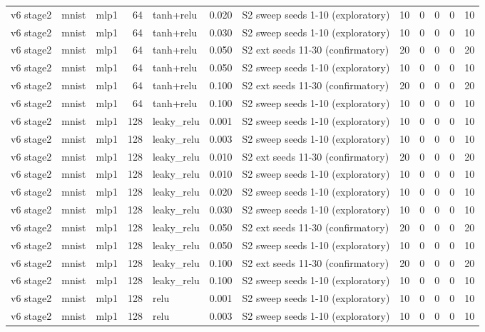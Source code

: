 \begin{table}[htbp]
{\begin{tabular}{@{}lllrlrlrrrrr@{}}
v6 stage2 & mnist & mlp1 & 64 & tanh+relu & 0.020 & S2 sweep seeds 1-10 (exploratory) & 10 & 0 & 0 & 0 & 10 \\
v6 stage2 & mnist & mlp1 & 64 & tanh+relu & 0.030 & S2 sweep seeds 1-10 (exploratory) & 10 & 0 & 0 & 0 & 10 \\
v6 stage2 & mnist & mlp1 & 64 & tanh+relu & 0.050 & S2 ext seeds 11-30 (confirmatory) & 20 & 0 & 0 & 0 & 20 \\
v6 stage2 & mnist & mlp1 & 64 & tanh+relu & 0.050 & S2 sweep seeds 1-10 (exploratory) & 10 & 0 & 0 & 0 & 10 \\
v6 stage2 & mnist & mlp1 & 64 & tanh+relu & 0.100 & S2 ext seeds 11-30 (confirmatory) & 20 & 0 & 0 & 0 & 20 \\
v6 stage2 & mnist & mlp1 & 64 & tanh+relu & 0.100 & S2 sweep seeds 1-10 (exploratory) & 10 & 0 & 0 & 0 & 10 \\
v6 stage2 & mnist & mlp1 & 128 & leaky\_relu & 0.001 & S2 sweep seeds 1-10 (exploratory) & 10 & 0 & 0 & 0 & 10 \\
v6 stage2 & mnist & mlp1 & 128 & leaky\_relu & 0.003 & S2 sweep seeds 1-10 (exploratory) & 10 & 0 & 0 & 0 & 10 \\
v6 stage2 & mnist & mlp1 & 128 & leaky\_relu & 0.010 & S2 ext seeds 11-30 (confirmatory) & 20 & 0 & 0 & 0 & 20 \\
v6 stage2 & mnist & mlp1 & 128 & leaky\_relu & 0.010 & S2 sweep seeds 1-10 (exploratory) & 10 & 0 & 0 & 0 & 10 \\
v6 stage2 & mnist & mlp1 & 128 & leaky\_relu & 0.020 & S2 sweep seeds 1-10 (exploratory) & 10 & 0 & 0 & 0 & 10 \\
v6 stage2 & mnist & mlp1 & 128 & leaky\_relu & 0.030 & S2 sweep seeds 1-10 (exploratory) & 10 & 0 & 0 & 0 & 10 \\
v6 stage2 & mnist & mlp1 & 128 & leaky\_relu & 0.050 & S2 ext seeds 11-30 (confirmatory) & 20 & 0 & 0 & 0 & 20 \\
v6 stage2 & mnist & mlp1 & 128 & leaky\_relu & 0.050 & S2 sweep seeds 1-10 (exploratory) & 10 & 0 & 0 & 0 & 10 \\
v6 stage2 & mnist & mlp1 & 128 & leaky\_relu & 0.100 & S2 ext seeds 11-30 (confirmatory) & 20 & 0 & 0 & 0 & 20 \\
v6 stage2 & mnist & mlp1 & 128 & leaky\_relu & 0.100 & S2 sweep seeds 1-10 (exploratory) & 10 & 0 & 0 & 0 & 10 \\
v6 stage2 & mnist & mlp1 & 128 & relu & 0.001 & S2 sweep seeds 1-10 (exploratory) & 10 & 0 & 0 & 0 & 10 \\
v6 stage2 & mnist & mlp1 & 128 & relu & 0.003 & S2 sweep seeds 1-10 (exploratory) & 10 & 0 & 0 & 0 & 10 \\

\end{tabular}}
\end{table}
